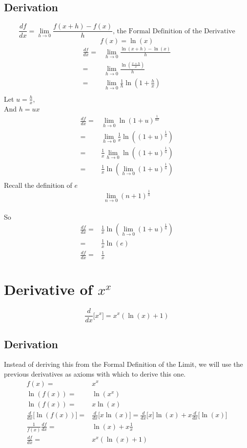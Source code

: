 \documentclass[11pt]{book}
\begin{document}
\subsection{Derivation}
\[\frac{df}{dx} = \lim_{h\to0}\frac{f(x+h) -f(x)}{h}  \text{, the Formal Definition of the Derivative} \]
\[ f(x) = \ln{(x)} \]
\begin{align*}
\frac{df}{dx} =& \lim_{h\to0}\frac{\ln{(x+h)} - \ln(x)}{h} \\
=& \lim_{h\to0}\frac{ \ln{\left(\frac{x+h}{x}\right)} }{h} \\
=& \lim_{h\to0}\frac{1}{h} \ln{\left(1+ \frac{h}{x}\right)} \\
\end{align*}
Let \(u = \frac{h}{x}\), \\
And \(h = ux \) \\
\begin{align*}
\frac{df}{dx} =& \lim_{h\to0} \ln{\left(1+ u\right)^\frac{1}{ux}} \\
=& \lim_{h\to0} \frac{1}{x}\ln{\left((1+ u)^\frac{1}{u}\right)} \\
=&  \frac{1}{x}\lim_{h\to0}\ln{\left((1+ u)^\frac{1}{u}\right)} \\
=&  \frac{1}{x}\ln{\left(\lim_{h\to0}(1+ u)^\frac{1}{u}\right)} \\
\end{align*}
Recall the definition of \(e\)
\[\lim_{n\to0}(n+1)^{\frac{1}{n}}\]\\
So
\begin{align*}
\frac{df}{dx} =& \frac{1}{x}\ln{\left(\lim_{h\to0}(1+ u)^\frac{1}{u}\right)} \\
=& \frac{1}{x}\ln{(e)} \\
\frac{df}{dx} =& \frac{1}{x}
\end{align*}

\section{Derivative of $x^x$}
\[ \frac{d}{dx}\bigg[x^x \bigg] = x^x(\ln{(x)} + 1) \]

\subsection{Derivation}
Instead of deriving this from the Formal Definition of the Limit, we will use the previous derivatives as axioms with which to derive this one.
\begin{align*}
f(x)  =& x^x \\
\ln{(f(x))} =& \ln{(x^x)} \\
\ln{(f(x))} =& x\ln{(x)} \\
\frac{d}{dx}\bigg[\ln{(f(x))}\bigg] =& \frac{d}{dx} \bigg[ x\ln{(x)} \bigg] = \frac{d}{dx}\bigg[ x \bigg]\ln{(x)} + x\frac{d}{dx}\bigg[\ln{(x)} \bigg]\\
\frac{1}{f(x)}\frac{df}{dx} =&  \ln{(x)} + x\frac{1}{x} \\
\frac{df}{dx} =&  x^x(\ln{(x)} + 1)
\end{align*}
\end{document}
